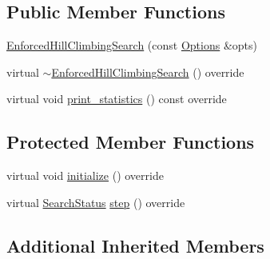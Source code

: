 \subsection*{Public Member Functions}
\begin{DoxyCompactItemize}
\item 
\hyperlink{classEnforcedHillClimbingSearch_ab1a9588921fbc54c2201d58e4c4630dd}{Enforced\-Hill\-Climbing\-Search} (const \hyperlink{classOptions}{Options} \&opts)
\item 
virtual \hyperlink{classEnforcedHillClimbingSearch_a5586307df39c671bb80ce52b1ebeff6b}{$\sim$\-Enforced\-Hill\-Climbing\-Search} () override
\item 
virtual void \hyperlink{classEnforcedHillClimbingSearch_a2b1cd0e9682f6859aef38af51b5664b4}{print\-\_\-statistics} () const override
\end{DoxyCompactItemize}
\subsection*{Protected Member Functions}
\begin{DoxyCompactItemize}
\item 
virtual void \hyperlink{classEnforcedHillClimbingSearch_a4ec8b675b4ae6813a1a4726d511ae1ed}{initialize} () override
\item 
virtual \hyperlink{search__engine_8h_a366b21ffe1b22f34ec2fa8f101b979f3}{Search\-Status} \hyperlink{classEnforcedHillClimbingSearch_a792b3c175edfe829dd67401eb1060fce}{step} () override
\end{DoxyCompactItemize}
\subsection*{Additional Inherited Members}


